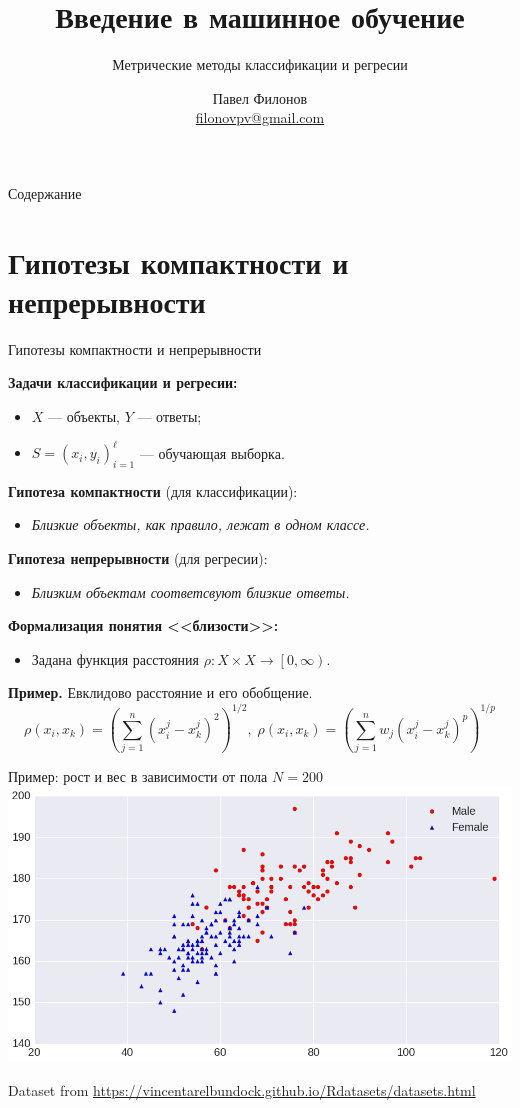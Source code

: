 \documentclass{beamer}
\author{Павел Филонов \\ \href{mailto:filonovpv@gmail.com}{filonovpv@gmail.com}}
\title{Введение в машинное обучение}
\subtitle{Метрические методы классификации и регресии}
\begin{document}
\begin{frame}[plain]
    \titlepage
\end{frame}
\begin{frame}[plain]{Содержание}
  \tableofcontents
\end{frame}
\section{Гипотезы компактности и непрерывности}
\begin{frame}{Гипотезы компактности и непрерывности}

{\bf Задачи классификации и регресии:}
\begin{itemize}
    \item[] $X$ --- объекты, $Y$ --- ответы;
    \item[] $S = (x_i, y_i)_{i=1}^{\ell}$ --- обучающая выборка.
\end{itemize}

{\bf Гипотеза компактности} (для классификации):
\begin{itemize}
    \item[] {\it Близкие объекты, как правило, лежат в одном классе.}
\end{itemize}

{\bf Гипотеза непрерывности} (для регресии):
\begin{itemize}
    \item[] {\it Близким объектам соответсвуют близкие ответы.}
\end{itemize}

{\bf Формализация понятия <<близости>>:}
\begin{itemize}
    \item[] Задана функция расстояния $\rho : X \times X \rightarrow \left[ 0, \infty \right)$.
\end{itemize}

{\bf Пример.} Евклидово расстояние и его обобщение.
$$
    \rho(x_i, x_k) = \left(\sum\limits_{j=1}^{n}(x_i^j - x_k^j)^2\right)^{1/2},\;  \rho(x_i, x_k) = \left(\sum\limits_{j=1}^{n}w_j(x_i^j - x_k^j)^p\right)^{1/p}
$$
\end{frame}

\begin{frame}{Пример: рост и вес в зависимости от пола}
$N = 200$
\includegraphics[width=\linewidth]{../fig/height_n_weight.png}

\footnotesize
Dataset from \url{https://vincentarelbundock.github.io/Rdatasets/datasets.html}
\end{frame}
\end{document}

